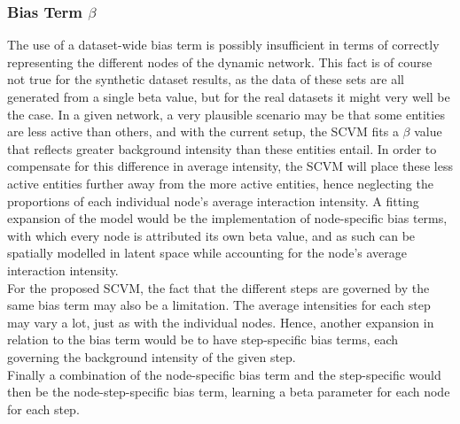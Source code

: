 \subsubsection{Bias Term $\beta$}
\label{sec:Discussion:Results:BiasTerm}
The use of a dataset-wide bias term is possibly insufficient in terms of correctly representing the different nodes of the dynamic network. 
This fact is of course not true for the synthetic dataset results, as the data of these sets are all generated from a single beta value, but for the real datasets it might very well be the case.
In a given network, a very plausible scenario may be that some entities are less active than others, and with the current setup, the SCVM fits a $\beta$ value that reflects greater background intensity than these entities entail.
In order to compensate for this difference in average intensity, the SCVM will place these less active entities further away from the more active entities, hence neglecting the proportions of each individual node's average interaction intensity.
A fitting expansion of the model would be the implementation of node-specific bias terms, with which every node is attributed its own beta value, and as such can be spatially modelled in latent space while accounting for the node's average interaction intensity. 
\\
For the proposed SCVM, the fact that the different steps are governed by the same bias term may also be a limitation. 
The average intensities for each step may vary a lot, just as with the individual nodes.
Hence, another expansion in relation to the bias term would be to have step-specific bias terms, each governing the background intensity of the given step.
\\
Finally a combination of the node-specific bias term and the step-specific would then be the node-step-specific bias term, learning a beta parameter for each node for each step.


